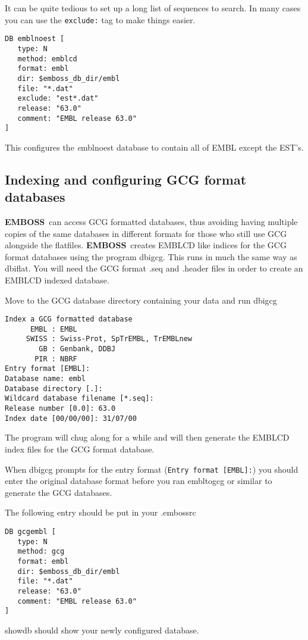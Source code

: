 \documentclass{report}
\newcommand{\ilcomm}[1]{{\tt #1}}
\newcommand{\filename}[1]{{\sf\textsl #1}}
\newcommand{\progname}[1]{{\sc #1}}
\newcommand{\EMBOSS}{{\sf\bfseries EMBOSS}}
\begin{document}
It can be quite tedious to set up a long list of sequences to search. In many cases you can use the \ilcomm{exclude:} tag to make things easier.
\begin{verbatim}
DB emblnoest [
   type: N
   method: emblcd
   format: embl
   dir: $emboss_db_dir/embl
   file: "*.dat"
   exclude: "est*.dat"
   release: "63.0"
   comment: "EMBL release 63.0"
]
\end{verbatim}
This configures the \filename{emblnoest} database to contain all of EMBL except the EST's.

\subsection{Indexing and configuring GCG format databases}

\EMBOSS\ can access GCG formatted databases, thus avoiding having multiple copies of the same databases in different formats for those who still use GCG alongside the flatfiles. 
\EMBOSS\ creates EMBLCD like indices for the GCG format databases using the program \progname{dbigcg}. 
This runs in much the same way as \progname{dbiflat}. You will need the GCG format \filename{.seq} and \filename{.header} files in order to create an EMBLCD indexed database.

Move to the GCG database directory containing your data and run \progname{dbigcg}
\begin{verbatim}
Index a GCG formatted database
      EMBL : EMBL
     SWISS : Swiss-Prot, SpTrEMBL, TrEMBLnew
        GB : Genbank, DDBJ
       PIR : NBRF
Entry format [EMBL]: 
Database name: embl
Database directory [.]: 
Wildcard database filename [*.seq]: 
Release number [0.0]: 63.0
Index date [00/00/00]: 31/07/00
\end{verbatim}
The program will chug along for a while and will then generate the EMBLCD index files for the GCG format database.

When \progname{dbigcg} prompts for the entry format (\ilcomm{Entry format [EMBL]:}) you should enter the original database format before you ran \progname{embltogcg} or similar to generate the \progname{GCG} databases.

The following entry should be put in your \filename{.embossrc}
\begin{verbatim}
DB gcgembl [
   type: N
   method: gcg
   format: embl
   dir: $emboss_db_dir/embl
   file: "*.dat"
   release: "63.0"
   comment: "EMBL release 63.0"
]
\end{verbatim}
\progname{showdb} should show your newly configured database.
\end{document}
